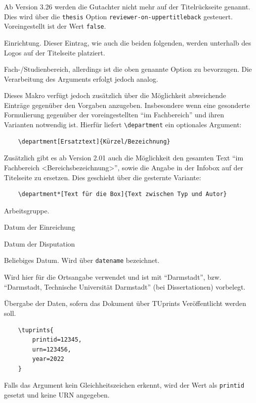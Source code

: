 \documentclass[
	ngerman,%
	accentcolor=9c,%
	ruledheaders=chapter,%
	class=book,%
	thesis={%
		type=dr,
		dr=rernat
	},
	fontsize=11pt,%
	parskip=half-,%
	custommargins=true,%
	marginpar=false,%
]{tudapub}
\newcommand*{\code}[1]{\texttt{#1}}
\begin{document}
\begin{description}
	      Ab Version 3.26 werden die Gutachter nicht mehr auf der Titelrückseite genannt. Dies wird über die \verb+thesis+ Option \verb+reviewer-on-uppertitleback+ gesteuert. Voreingestellt ist der Wert \verb+false+.
	\item[institution] Einrichtung. Dieser Eintrag, wie auch die beiden folgenden, werden unterhalb des Logos auf der Titelseite platziert.
	\item[department] Fach-/Studienbereich, allerdings ist die oben genannte Option zu bevorzugen. Die Verarbeitung des Arguments erfolgt jedoch analog.

	      Dieses Makro verfügt jedoch zusätzlich über die Möglichkeit abweichende Einträge gegenüber den Vorgaben anzugeben. Insbesondere wenn eine gesonderte Formulierung gegenüber der voreingestellten \enquote{im Fachbereich} und ihren Varianten notwendig ist. Hierfür liefert \code{\textbackslash{}department} ein optionales Argument:

\begin{verbatim}
    \department[Ersatztext]{Kürzel/Bezeichnung}
\end{verbatim}
	      Zusätzlich gibt es ab Version 2.01 auch die Möglichkeit den gesamten Text \enquote{im Fachbereich <Bereichsbezeichnung>}, sowie die Angabe in der Infobox auf der Titelseite zu ersetzen. Dies geschieht über die gesternte Variante:
\begin{verbatim}
    \department*[Text für die Box]{Text zwischen Typ und Autor}
\end{verbatim}
	\item[group] Arbeitsgruppe.
	\item[submissiondate] Datum der Einreichung
	\item[examdate] Datum der Disputation
	\item[date] Beliebiges Datum. Wird über \verb|datename| bezeichnet.
	\item[publishers] Wird hier für die Ortsangabe verwendet und ist mit \enquote{Darmstadt}, bzw. \enquote{Darmstadt, Technische Universität Darmstadt} (bei Dissertationen) vorbelegt.
	\item[tuprints] \label{page:tuprints}Übergabe der Daten, sofern das Dokument über TUprints Veröffentlicht werden soll.
\begin{verbatim}
    \tuprints{
        printid=12345,
        urn=123456,
        year=2022
    }
\end{verbatim}
	      Falls das Argument kein Gleichheitszeichen erkennt, wird der Wert als \code{printid} gesetzt und keine URN angegeben.


\end{description}
\end{document}
